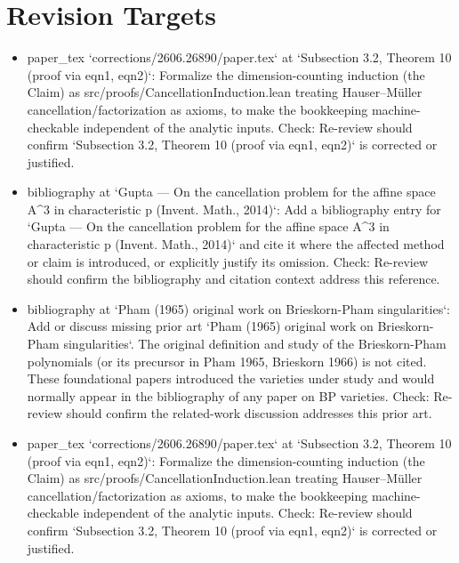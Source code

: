 \documentclass[11pt]{article}
\begin{document}
\section*{Revision Targets}
\begin{itemize}[leftmargin=*]
  \item [open] paper\_tex `corrections/2606.26890/paper.tex` at `Subsection 3.2, Theorem 10 (proof via eqn1, eqn2)`: Formalize the dimension-counting induction (the Claim) as src/proofs/CancellationInduction.lean treating Hauser--Müller cancellation/factorization as axioms, to make the bookkeeping machine-checkable independent of the analytic inputs. Check: Re-review should confirm `Subsection 3.2, Theorem 10 (proof via eqn1, eqn2)` is corrected or justified.
  \item [open] bibliography at `Gupta --- On the cancellation problem for the affine space A\^{}3 in characteristic p (Invent. Math., 2014)`: Add a bibliography entry for `Gupta --- On the cancellation problem for the affine space A\^{}3 in characteristic p (Invent. Math., 2014)` and cite it where the affected method or claim is introduced, or explicitly justify its omission. Check: Re-review should confirm the bibliography and citation context address this reference.
  \item [open] bibliography at `Pham (1965) original work on Brieskorn-Pham singularities`: Add or discuss missing prior art `Pham (1965) original work on Brieskorn-Pham singularities`. The original definition and study of the Brieskorn-Pham polynomials (or its precursor in Pham 1965, Brieskorn 1966) is not cited. These foundational papers introduced the varieties under study and would normally appear in the bibliography of any paper on BP varieties. Check: Re-review should confirm the related-work discussion addresses this prior art.
  \item [open] paper\_tex `corrections/2606.26890/paper.tex` at `Subsection 3.2, Theorem 10 (proof via eqn1, eqn2)`: Formalize the dimension-counting induction (the Claim) as src/proofs/CancellationInduction.lean treating Hauser--Müller cancellation/factorization as axioms, to make the bookkeeping machine-checkable independent of the analytic inputs. Check: Re-review should confirm `Subsection 3.2, Theorem 10 (proof via eqn1, eqn2)` is corrected or justified.
\end{itemize}
\end{document}
